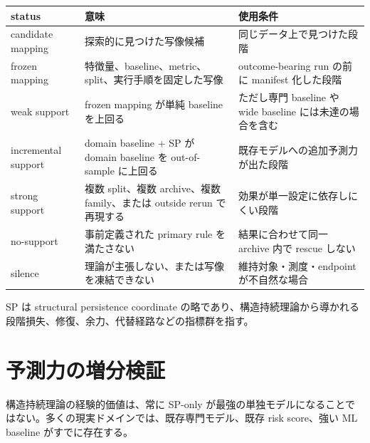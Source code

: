 \documentclass[12pt,a4paper]{article}
\begin{document}
{\def\LTcaptype{table} %
\begin{longtable}[]{@{}
  >{\raggedright\arraybackslash}p{}
  >{\raggedright\arraybackslash}p{}
  >{\raggedright\arraybackslash}p{}@{}}
\toprule\noalign{}
\begin{minipage}[b]{\linewidth}\raggedright
status
\end{minipage} & \begin{minipage}[b]{\linewidth}\raggedright
意味
\end{minipage} & \begin{minipage}[b]{\linewidth}\raggedright
使用条件
\end{minipage} \\
\midrule\noalign{}
\endhead
\bottomrule\noalign{}
\endlastfoot
candidate mapping & 探索的に見つけた写像候補 & 同じデータ上で見つけた段階 \\
frozen mapping & 特徴量、baseline、metric、split、実行手順を固定した写像 & outcome-bearing run の前に manifest 化した段階 \\
weak support & frozen mapping が単純 baseline を上回る & ただし専門 baseline や wide baseline には未達の場合を含む \\
incremental support & domain baseline + SP が domain baseline を out-of-sample に上回る & 既存モデルへの追加予測力が出た段階 \\
strong support & 複数 split、複数 archive、複数 family、または outside rerun で再現する & 効果が単一設定に依存しにくい段階 \\
no-support & 事前定義された primary rule を満たさない & 結果に合わせて同一 archive 内で rescue しない \\
silence & 理論が主張しない、または写像を凍結できない & 維持対象・測度・endpoint が不自然な場合 \\
\end{longtable}
}

SP は structural persistence coordinate の略であり、構造持続理論から導かれる段階損失、修復、余力、代替経路などの指標群を指す。

\section{予測力の増分検証}\label{ux4e88ux6e2cux529bux306eux5897ux5206ux691cux8a3c}

構造持続理論の経験的価値は、常に SP-only が最強の単独モデルになることではない。多くの現実ドメインでは、既存専門モデル、既存 risk score、強い ML baseline がすでに存在する。
\end{document}
